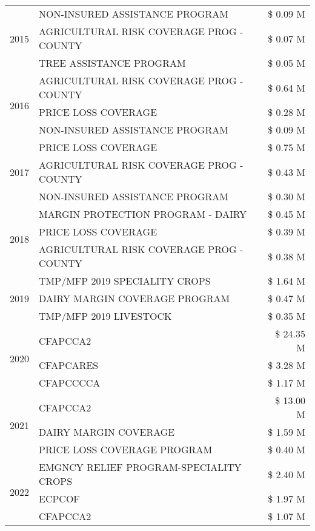 \begin{tabular}{llr}
\cline{1-3}
\multirow[t]{3}{*}{2015} & NON-INSURED ASSISTANCE PROGRAM & \$ 0.09 M \\
 & AGRICULTURAL RISK COVERAGE PROG - COUNTY & \$ 0.07 M \\
 & TREE ASSISTANCE PROGRAM & \$ 0.05 M \\
\cline{1-3}
\multirow[t]{3}{*}{2016} & AGRICULTURAL RISK COVERAGE PROG - COUNTY & \$ 0.64 M \\
 & PRICE LOSS COVERAGE & \$ 0.28 M \\
 & NON-INSURED ASSISTANCE PROGRAM & \$ 0.09 M \\
\cline{1-3}
\multirow[t]{3}{*}{2017} & PRICE LOSS COVERAGE & \$ 0.75 M \\
 & AGRICULTURAL RISK COVERAGE PROG - COUNTY & \$ 0.43 M \\
 & NON-INSURED ASSISTANCE PROGRAM & \$ 0.30 M \\
\cline{1-3}
\multirow[t]{3}{*}{2018} & MARGIN PROTECTION PROGRAM - DAIRY & \$ 0.45 M \\
 & PRICE LOSS COVERAGE & \$ 0.39 M \\
 & AGRICULTURAL RISK COVERAGE PROG - COUNTY & \$ 0.38 M \\
\cline{1-3}
\multirow[t]{3}{*}{2019} & TMP/MFP 2019 SPECIALITY CROPS & \$ 1.64 M \\
 & DAIRY MARGIN COVERAGE PROGRAM & \$ 0.47 M \\
 & TMP/MFP 2019 LIVESTOCK & \$ 0.35 M \\
\cline{1-3}
\multirow[t]{3}{*}{2020} & CFAPCCA2 & \$ 24.35 M \\
 & CFAPCARES & \$ 3.28 M \\
 & CFAPCCCCA & \$ 1.17 M \\
\cline{1-3}
\multirow[t]{3}{*}{2021} & CFAPCCA2 & \$ 13.00 M \\
 & DAIRY MARGIN COVERAGE & \$ 1.59 M \\
 & PRICE LOSS COVERAGE PROGRAM & \$ 0.40 M \\
\cline{1-3}
\multirow[t]{3}{*}{2022} & EMGNCY RELIEF PROGRAM-SPECIALITY CROPS & \$ 2.40 M \\
 & ECPCOF & \$ 1.97 M \\
 & CFAPCCA2 & \$ 1.07 M \\
\cline{1-3}
\bottomrule
\end{tabular}
